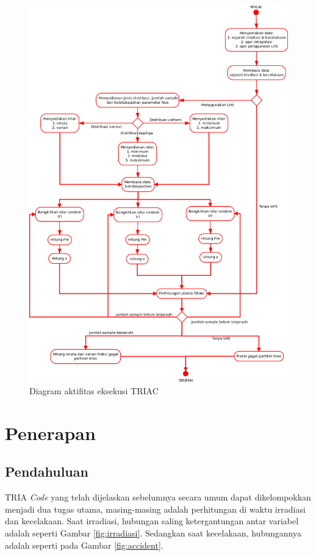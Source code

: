 \documentclass[a4paper,11pt]{report}
\begin{document}
\begin{figure}
  \begin{center}
    \includegraphics[scale=.45]{pics/aktifitasTotal.png}
    \caption{Diagram aktifitas eksekusi TRIAC}
    \label{fig:total}
  \end{center}
\end{figure}

\chapter{Penerapan}
\section{Pendahuluan}
\label{sec:introPenerapan}
TRIA \textit{Code} yang telah dijelaskan sebelumnya secara umum dapat dikelompokkan menjadi dua tugas utama, masing-masing adalah perhitungan di waktu irradiasi dan kecelakaan. Saat irradiasi, hubungan saling ketergantungan antar variabel adalah seperti Gambar \ref{fig:irradiasi}. Sedangkan saat kecelakaan, hubungannya adalah seperti pada Gambar \ref{fig:accident}.
\end{document}
